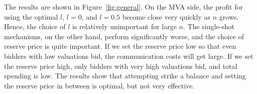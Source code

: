 The results are shown in Figure~\ref{fig:general}. 
On the MVA side, the profit for using the optimal $l$,
$l = 0$, and $l = 0.5$ become close very quickly as $n$ grows.
Hence, the choice of $l$ is relatively unimportant
for large $n$. 
The single-shot mechanisms, on the other hand, perform significantly worse,
and the choice of reserve price is quite important.
If we set the reserve price low so that even bidders with low valuations
bid, the communication costs will get large.
If we set the reserve price high, only bidders with very high valuations
bid, and total spending is low.  The results show that attempting strike a
balance and setting the reserve price in between is optimal, but not very effective. 




 





